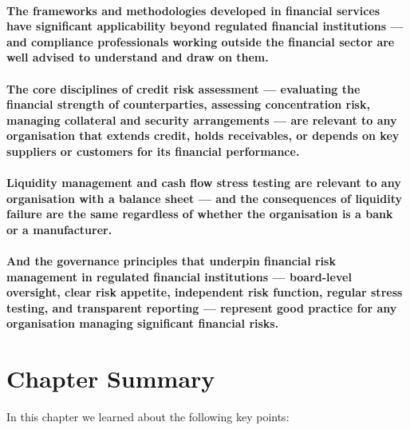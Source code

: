 \paragraph{The frameworks and methodologies developed in financial services have significant applicability beyond regulated financial institutions — and compliance professionals working outside the financial sector are well advised to understand and draw on them.}
\paragraph{The core disciplines of credit risk assessment — evaluating the financial strength of counterparties, assessing concentration risk, managing collateral and security arrangements — are relevant to any organisation that extends credit, holds receivables, or depends on key suppliers or customers for its financial performance.}
\paragraph{Liquidity management and cash flow stress testing are relevant to any organisation with a balance sheet — and the consequences of liquidity failure are the same regardless of whether the organisation is a bank or a manufacturer.}
\paragraph{And the governance principles that underpin financial risk management in regulated financial institutions — board-level oversight, clear risk appetite, independent risk function, regular stress testing, and transparent reporting — represent good practice for any organisation managing significant financial risks.}

\newpage
\section{Chapter Summary}
In this chapter we learned about the following key points:

